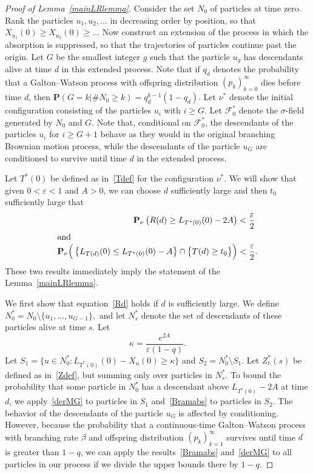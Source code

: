 \documentclass[AHL,Unicode,longabstracts,published]{cedram}
\newcommand*\eps{\varepsilon}
\renewcommand*\P{\mathbf{P}}
\newcommand\F{\mathcal{F}}
\newcommand{\1} {\mathds{1}}
\begin{document}
\begin{proof}[Proof of Lemma~\ref{mainLRlemma}]
Consider the set $N_0$ of particles at time zero. Rank the particles $u_1, u_2, \dots$ in decreasing order by position, so that $X_{u_1}(0) \geq X_{u_2}(0) \geq \dots$ Now construct an extension of the process in which the absorption is suppressed, so that the trajectories of particles continue past the origin. Let $G$ be the smallest integer $g$ such that the particle $u_g$ has descendants alive at time $d$ in this extended process. Note that if $q_d$ denotes the probability that a Galton--Watson process with offspring distribution $(p_k)_{k=0}^{\infty}$ dies before time $d$, then $\P(G = k|\#N_0 \geq k) = q_d^{k-1}(1 - q_d)$. Let $\nu^*$ denote the initial configuration consisting of the particles $u_i$ with $i \geq G$. Let $\F_0^*$ denote the $\sigma$-field generated by $N_0$ and $G$. Note that, conditional on $\F_0^*$, the descendants of the particles $u_i$ for $i \geq G+1$ behave as they would in the original branching Brownian motion process, while the descendants of the particle $u_G$ are conditioned to survive until time $d$ in the extended process.

Let $T^*(0)$ be defined as in~\eqref{Tdef} for the configuration $\nu^*$. We will show that given $0 < \eps < 1$ and $A > 0$, we can choose $d$ sufficiently large and then $t_0$ sufficiently large that
\begin{align}
\P_{\nu}\left(R(d) \geq L_{T^*(0)}(0) - 2A\right) &< \frac{\eps}{2}\label{Rd}\\
\intertext{and}
\P_{\nu}\Big(\left\{L_{T(d)}(0) \leq L_{T^*(0)}(0) - A\right\} \cap \big\{T(d) \geq t_0\big\} \Big) &< \frac{\eps}{2}.\label{needL1}
\end{align}
These two results immediately imply the statement of the Lemma~\ref{mainLRlemma}.

We first show that equation~\eqref{Rd} holds if $d$ is sufficiently large. We define $N^*_0 = N_0 \setminus \{u_1, \dots, u_{G-1}\},$ and let $N^*_s$ denote the set of descendants of these particles alive at time $s$. Let
\[
\kappa = \frac{e^{2A}}{\eps (1-q)}.
\]
Let $S_1 = \{u \in N^*_0: L_{T^*(0)}(0) - X_u(0) \geq \kappa\}$ and $S_2 = N^*_0 \setminus S_1$. Let $Z_t^*(s)$ be defined as in~\eqref{Zdef}, but summing only over particles in $N^*_s$. To bound the probability that some particle in $N_0^*$ has a descendant above $L_{T^*(0)} - 2A$ at time $d$, we apply~\eqref{derMG} to particles in $S_1$ and~\eqref{Bramabs} to particles in $S_2$. The behavior of the descendants of the particle $u_G$ is affected by conditioning. However, because the probability that a continuous-time Galton--Watson process with branching rate $\beta$ and offspring distribution $(p_k)_{k=1}^{\infty}$ survives until time $d$ is greater than $1 - q$, we can apply the results~\eqref{Bramabs} and~\eqref{derMG} to all particles in our process if we divide the upper bounds there by $1 - q$.


\end{proof}
\end{document}
